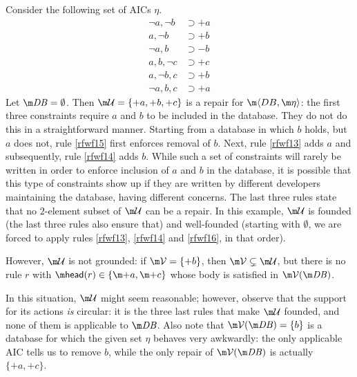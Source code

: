 \begin{example}\label{ex:founded:well-founded}
  Consider the following set of AICs $\eta$.
  \begin{align}
    \neg a,\neg b&\supset{+a} \label{rfwf13} \\
    a,\neg b&\supset{+b} \label{rfwf14} \\
    \neg a,b&\supset{-b} \label{rfwf15} \\
    a,b,\neg c&\supset{+c} \label{rfwf16} \\
    a,\neg b,c&\supset{+b} \label{rfwf17} \\
    \neg a,b,c&\supset{+a}\label{rfwf18}
  \end{align}
  Let $\db=\emptyset$.
  Then $\UU=\{{+a},{+b},{+c}\}$ is a repair for $\fulldb$: the first three constraints require ${a}$ and ${b}$ to be included in the database. 
  They do not do this in a straightforward manner. Starting from a database in which $b$ holds, but $a$ does not, rule \eqref{rfwf15} first enforces removal of $b$. 
  Next, rule \eqref{rfwf13} adds $a$ and subsequently, rule \eqref{rfwf14} adds $b$. 
  While such a set of constraints will rarely be written in order to enforce inclusion of $a$ and $b$ in the database, it is possible that this type of constraints show up if they are written by different developers maintaining the database, having different concerns. 
  The last three rules state that no $2$-element subset of $\UU$ can be a repair.
  In this example, $\UU$ is founded (the last three rules also ensure that) and well-founded (starting with $\emptyset$, we are forced to apply rules \ref{rfwf13}, \ref{rfwf14} and \ref{rfwf16}, in that order).

  However, $\UU$ is not grounded: if $\VV=\{{+b}\}$, then $\VV\subsetneq\UU$, but there is no rule $r$ with $\head(r)\in\{\add a, \add c\} $ whose body is satisfied in $\VV(\db)$. %
\end{example}
In this situation, $\UU$ might seem reasonable; however, observe that the support for its actions \emph{is} circular: it is the three last rules that make $\UU$ founded, and none of them is applicable to $\db$.
Also note that $\VV(\db)=\{b\}$ is a database for which the given set $\eta$ behaves very awkwardly: the only applicable AIC tells us to remove $b$, while the only repair of $\VV(\db)$ is actually $\{{+a},{+c}\}$.

